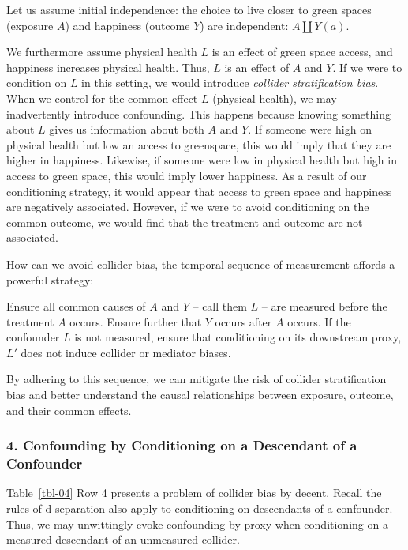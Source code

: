 \documentclass[
  singlecolumn]{article}
\begin{document}
Let us assume initial independence: the choice to live closer to green
spaces (exposure \(A\)) and happiness (outcome \(Y\)) are independent:
\(A \coprod Y(a)\).

We furthermore assume physical health \(L\) is an effect of green space
access, and happiness increases physical health. Thus, \(L\) is an
effect of \(A\) and \(Y\). If we were to condition on \(L\) in this
setting, we would introduce \emph{collider stratification bias}. When we
control for the common effect \(L\) (physical health), we may
inadvertently introduce confounding. This happens because knowing
something about \(L\) gives us information about both \(A\) and \(Y\).
If someone were high on physical health but low an access to greenspace,
this would imply that they are higher in happiness. Likewise, if someone
were low in physical health but high in access to green space, this
would imply lower happiness. As a result of our conditioning strategy,
it would appear that access to green space and happiness are negatively
associated. However, if we were to avoid conditioning on the common
outcome, we would find that the treatment and outcome are not
associated.

How can we avoid collider bias, the temporal sequence of measurement
affords a powerful strategy:

Ensure all common causes of \(A\) and \(Y\) -- call them \(L\) -- are
measured before the treatment \(A\) occurs. Ensure further that \(Y\)
occurs after \(A\) occurs. If the confounder \(L\) is not measured,
ensure that conditioning on its downstream proxy, \(L'\) does not induce
collider or mediator biases.

By adhering to this sequence, we can mitigate the risk of collider
stratification bias and better understand the causal relationships
between exposure, outcome, and their common effects.

\subsubsection{4. Confounding by Conditioning on a Descendant of a
Confounder}\label{confounding-by-conditioning-on-a-descendant-of-a-confounder}

Table~\ref{tbl-04} Row 4 presents a problem of collider bias by decent.
Recall the rules of d-separation also apply to conditioning on
descendants of a confounder. Thus, we may unwittingly evoke confounding
by proxy when conditioning on a measured descendant of an unmeasured
collider.
\end{document}

